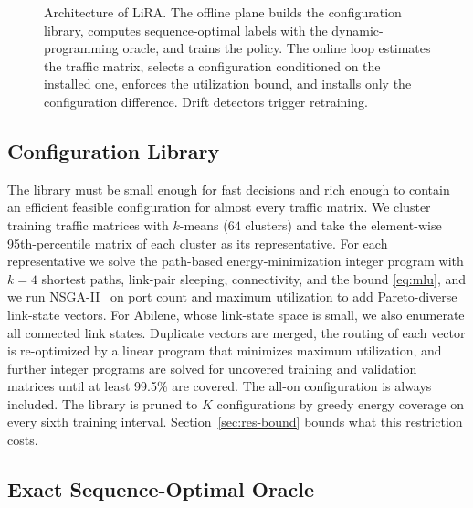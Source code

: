 \documentclass[preprint,12pt]{elsarticle}
\begin{document}
\begin{figure}[t]
{}
\caption{Architecture of LiRA. The offline plane builds the configuration library, computes sequence-optimal labels with the dynamic-programming oracle, and trains the policy. The online loop estimates the traffic matrix, selects a configuration conditioned on the installed one, enforces the utilization bound, and installs only the configuration difference. Drift detectors trigger retraining.}
\label{fig:arch}
\end{figure}

\subsection{Configuration Library}\label{sec:library}

The library must be small enough for fast decisions and rich enough to contain an efficient feasible configuration for almost every traffic matrix. We cluster training traffic matrices with $k$-means ($64$ clusters) and take the element-wise 95th-percentile matrix of each cluster as its representative. For each representative we solve the path-based energy-minimization integer program with $k=4$ shortest paths, link-pair sleeping, connectivity, and the bound \eqref{eq:mlu}, and we run NSGA-II~\cite{deb2002nsga2} on port count and maximum utilization to add Pareto-diverse link-state vectors. For Abilene, whose link-state space is small, we also enumerate all connected link states. Duplicate vectors are merged, the routing of each vector is re-optimized by a linear program that minimizes maximum utilization, and further integer programs are solved for uncovered training and validation matrices until at least 99.5\% are covered. The all-on configuration is always included. The library is pruned to $K$ configurations by greedy energy coverage on every sixth training interval. Section~\ref{sec:res-bound} bounds what this restriction costs.

\subsection{Exact Sequence-Optimal Oracle}
\end{document}
